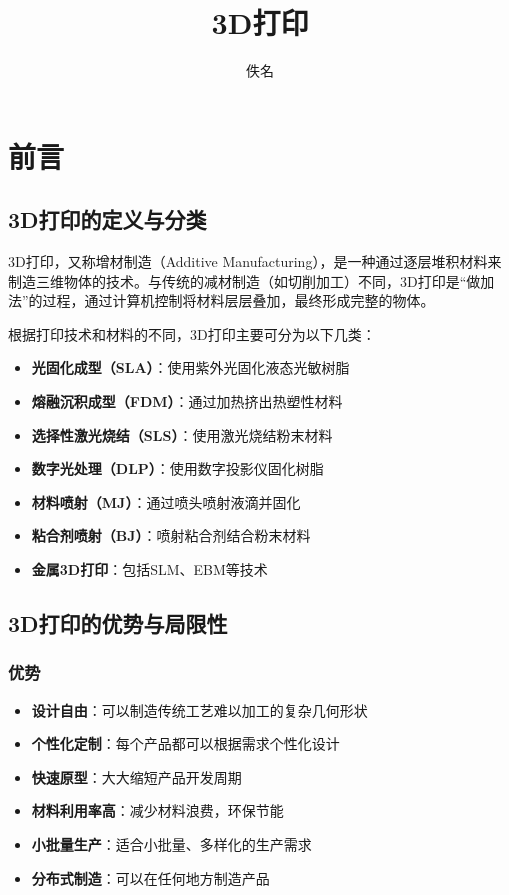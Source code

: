 \documentclass[12pt,UTF8]{ctexbook}
\title{\heiti\zihao{0} 3D打印}
\author{佚名}
\date{}
\begin{document}
\maketitle
\tableofcontents

\frontmatter

\mainmatter

\chapter{前言}

\section{3D打印的定义与分类}

3D打印，又称增材制造（Additive Manufacturing），是一种通过逐层堆积材料来制造三维物体的技术。与传统的减材制造（如切削加工）不同，3D打印是“做加法”的过程，通过计算机控制将材料层层叠加，最终形成完整的物体。

根据打印技术和材料的不同，3D打印主要可分为以下几类：
\begin{itemize}
\item \textbf{光固化成型（SLA）}：使用紫外光固化液态光敏树脂
\item \textbf{熔融沉积成型（FDM）}：通过加热挤出热塑性材料
\item \textbf{选择性激光烧结（SLS）}：使用激光烧结粉末材料
\item \textbf{数字光处理（DLP）}：使用数字投影仪固化树脂
\item \textbf{材料喷射（MJ）}：通过喷头喷射液滴并固化
\item \textbf{粘合剂喷射（BJ）}：喷射粘合剂结合粉末材料
\item \textbf{金属3D打印}：包括SLM、EBM等技术
\end{itemize}

\section{3D打印的优势与局限性}
\subsection{优势}
\begin{itemize}
\item \textbf{设计自由}：可以制造传统工艺难以加工的复杂几何形状
\item \textbf{个性化定制}：每个产品都可以根据需求个性化设计
\item \textbf{快速原型}：大大缩短产品开发周期
\item \textbf{材料利用率高}：减少材料浪费，环保节能
\item \textbf{小批量生产}：适合小批量、多样化的生产需求
\item \textbf{分布式制造}：可以在任何地方制造产品
\end{itemize}
\end{document}
